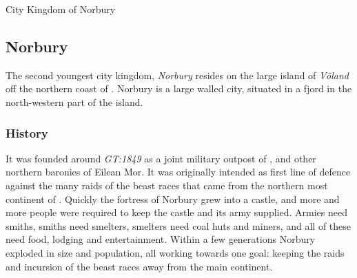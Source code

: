 \begin{infobox}{City Kingdom of Norbury}
\begin{minipage}{0.68\linewidth}
\begin{itemize}[label={},noitemsep]
    \end{itemize}
  \end{minipage}
\end{infobox}

\subsection{Norbury}
\label{sec:Norbury}


The second youngest city kingdom, \emph{Norbury} resides on the large island
of \emph{Völand} off the northern coast of . Norbury
is a large walled city, situated in a fjord in the north-western part of the
island.

\subsubsection{History}

It was founded around \emph{GT:1849} as a joint military outpost of
, and other northern baronies of Eilean Mor. It was
originally intended as first line of defence against the many raids of the
beast races that came from the northern most continent of
. Quickly the fortress of Norbury grew into a castle,
and more and more people were required to keep the castle and its army
supplied. Armies need smiths, smiths need smelters, smelters need coal huts
and miners, and all of these need food, lodging and entertainment. Within a
few generations Norbury exploded in size and population, all working towards
one goal: keeping the raids and incursion of the beast races away from the
main continent.


